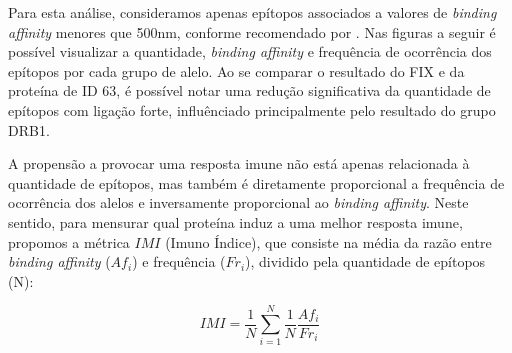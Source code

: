 Para esta análise, consideramos apenas epítopos associados a valores de \textit{binding affinity} 
menores que 500nm,
conforme recomendado por \cite{Jensen2018NetMHCIIpan}. 
Nas figuras a seguir é possível visualizar a quantidade, \textit{binding affinity} e frequência de ocorrência 
dos epítopos por cada grupo de alelo. Ao se comparar o resultado do FIX e da proteína de ID 63,
é possível notar uma redução significativa da quantidade de epítopos com ligação forte, influênciado principalmente 
pelo resultado do grupo DRB1. 

\begin{figure}%
    \centering
    \qquad
\end{figure}

A propensão a provocar uma resposta imune não está apenas relacionada à quantidade de epítopos, 
mas também é diretamente proporcional a frequência de ocorrência dos alelos e inversamente proporcional 
ao \textit{binding affinity}. Neste sentido, para mensurar qual proteína induz a uma melhor resposta imune, propomos a 
métrica $IMI$ (Imuno Índice), que consiste na média da razão entre \textit{binding affinity} (${Af}_{i}$) 
e frequência ($Fr_{i}$), 
dividido pela quantidade de epítopos (N):

\begin{equation}
    IMI = \frac{1}{N} \sum_{i=1}^{N} \frac{1}{N} \frac{{Af}_{i}}{Fr_{i}}
\end{equation}

